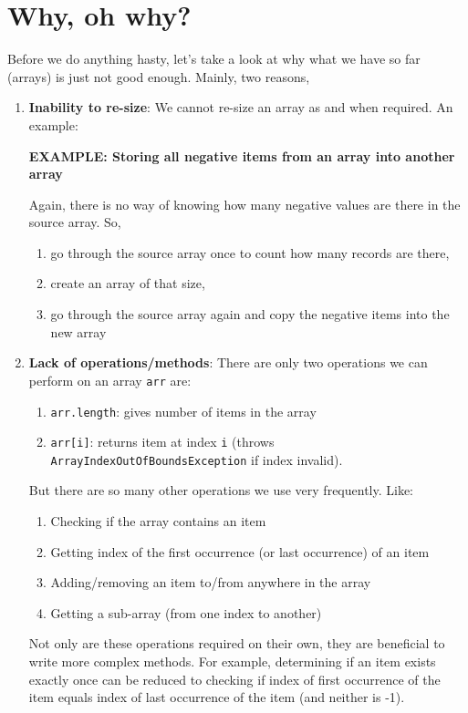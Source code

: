 \def\topic{Lists}

 
\section{Why, oh why?}

Before we do anything hasty, let's take a look at why what we have so far (arrays) is just not good enough. Mainly, two reasons,

\begin{enumerate}
  \item \textbf{Inability to re-size}: We cannot re-size an array as and when required. An example:
  
    \begin{center} 
    	\textbf{EXAMPLE: Storing all negative items from an array into another array}
    \end{center}
    
    Again, there is no way of knowing how many negative values are there in the source array. So, 
	\begin{enumerate}
	  \item go through the source array once to count how many records are there,
	  \item create an array of that size,
	  \item go through the source array again and copy the negative items into the new array
	\end{enumerate}
     
  \item \textbf{Lack of operations/methods}: There are only two operations we can perform on an array \texttt{arr} are:
  
  	\begin{enumerate}
  		\item \texttt{arr.length}: gives number of items in the array
  		\item \texttt{arr[i]}: returns item at index \texttt{i} (throws \texttt{ArrayIndexOutOfBoundsException} if index invalid).
	\end{enumerate}

	But there are so many other operations we use very frequently. Like:
	
	\begin{enumerate}
  		\item Checking if the array contains an item
  		\item Getting index of the first occurrence (or last occurrence) of an item
  		\item Adding/removing an item to/from anywhere in the array
  		\item Getting a sub-array (from one index to another) 
	\end{enumerate}

	Not only are these operations required on their own, they are beneficial to write more complex methods. For example, determining if an item exists exactly once can be reduced to checking if index of first occurrence of the item equals index of last occurrence of the item (and neither is -1).
\end{enumerate}


